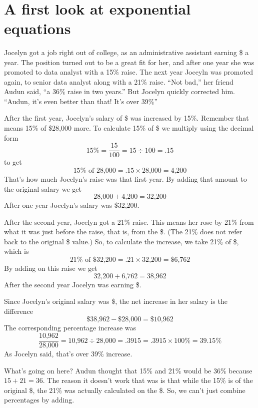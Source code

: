 ~\vspace{.1in}

\section{A first look at exponential equations}

Jocelyn got a job right out of college, as an administrative assistant earning \$ a year.  The position turned out to be a great fit for her, and after one year she was promoted to data analyst with a 15\% raise.  The next year Joceyln was promoted again, to senior data analyst along with a 21\% raise.  ``Not bad,'' her friend Audun said, ``a 36\% raise in two years.''  But Jocelyn quickly corrected him.  ``Audun, it's even better than that!  It's over 39\%''

After the first year, Jocelyn's salary of \$ was increased by 15\%.  Remember that means 15\% of \$28,000 more.  To calculate 15\% of \$ we multiply using the decimal form 
$$15\% = \frac{15}{100} = 15 \div 100 = .15$$
to get 
$$15\% \text{ of  28,000} = .15 \times \text{28,000} = \text{4,200}$$
  That's how much Jocelyn's raise was that first year.  By adding that amount to the original salary we get 
  $$\text{28,000} + \text{4,200} = \text{32,200}$$
After one year Jocelyn's salary was \${32,200}.

After the second year, Jocelyn got a 21\% raise.  This means her rose by 21\% from what it was just before the raise, that is, from the \$.  (The 21\% does not refer back to the original \$ value.)  So, to calculate the increase, we take 21\% of \$, which is 
$$21\% \text{ of  \$32,200} = .21 \times \text{32,200} = \text{\$6,762}$$  
By adding on this raise we get 
$$\text{32,200}+ \text{6,762} = \text{38,962}$$  
After the second year Jocelyn was earning \$.

Since Jocelyn's original salary was \$, the net increase in her salary is the difference 
$$\text{\$38,962} - \text{\$28,000} = \text{\$10,962}$$ The corresponding percentage increase was 
$$\frac{\text{10,962}}{\text{28,000}}= \text{10,962} \div \text{28,000} = .3915 = .3915 \times 100\% = 39.15\%$$  
As Jocelyn said, that's over 39\% increase.  

What's going on here? Audun thought that 15\% and 21\% would be 36\% because $15 + 21 = 36$.
The reason it doesn't work that was is that while the 15\% is of the original \$, the 21\% was actually calculated on the \$.  So, we can't just combine percentages by adding.

